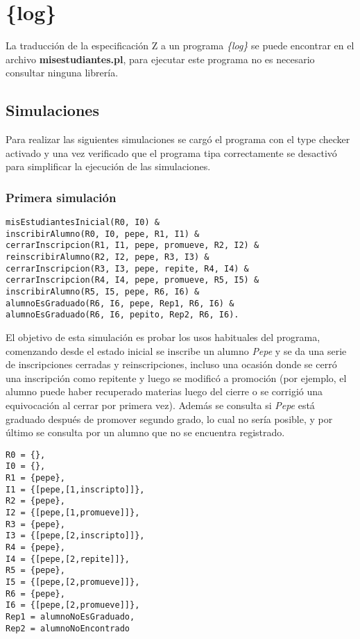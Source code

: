 \documentclass{article}
\begin{document}
\section{\{log\}}
La traducción de la especificación Z a un programa \emph{\{log\}} se puede encontrar en el archivo \textbf{misestudiantes.pl}, para ejecutar este programa no es necesario consultar ninguna librería.

\subsection{Simulaciones}
Para realizar las siguientes simulaciones se cargó el programa con el type checker activado y una vez verificado que el programa tipa correctamente se desactivó para simplificar la ejecución de las simulaciones.

\subsubsection*{Primera simulación}
\begin{verbatim}
misEstudiantesInicial(R0, I0) & 
inscribirAlumno(R0, I0, pepe, R1, I1) & 
cerrarInscripcion(R1, I1, pepe, promueve, R2, I2) & 
reinscribirAlumno(R2, I2, pepe, R3, I3) & 
cerrarInscripcion(R3, I3, pepe, repite, R4, I4) & 
cerrarInscripcion(R4, I4, pepe, promueve, R5, I5) & 
inscribirAlumno(R5, I5, pepe, R6, I6) & 
alumnoEsGraduado(R6, I6, pepe, Rep1, R6, I6) & 
alumnoEsGraduado(R6, I6, pepito, Rep2, R6, I6).
\end{verbatim}

El objetivo de esta simulación es probar los usos habituales del programa, comenzando desde el estado inicial se inscribe un alumno \emph{Pepe} y se da una serie de inscripciones cerradas y reinscripciones, incluso una ocasión donde se cerró una inscripción como repitente y luego se modificó a promoción (por ejemplo, el alumno puede haber recuperado materias luego del cierre o se corrigió una equivocación al cerrar por primera vez). Además se consulta si \emph{Pepe} está graduado después de promover segundo grado, lo cual no sería posible, y por último se consulta por un alumno que no se encuentra registrado.

\begin{verbatim}
R0 = {},  
I0 = {},  
R1 = {pepe},  
I1 = {[pepe,[1,inscripto]]},  
R2 = {pepe},  
I2 = {[pepe,[1,promueve]]},  
R3 = {pepe},  
I3 = {[pepe,[2,inscripto]]},  
R4 = {pepe},  
I4 = {[pepe,[2,repite]]},  
R5 = {pepe},  
I5 = {[pepe,[2,promueve]]},  
R6 = {pepe},  
I6 = {[pepe,[2,promueve]]},  
Rep1 = alumnoNoEsGraduado,  
Rep2 = alumnoNoEncontrado
\end{verbatim}
\end{document}
